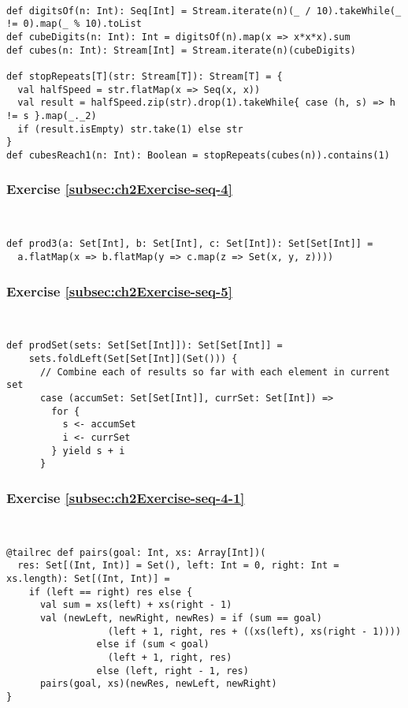 ~
\begin{lstlisting}
def digitsOf(n: Int): Seq[Int] = Stream.iterate(n)(_ / 10).takeWhile(_ != 0).map(_ % 10).toList
def cubeDigits(n: Int): Int = digitsOf(n).map(x => x*x*x).sum
def cubes(n: Int): Stream[Int] = Stream.iterate(n)(cubeDigits)

def stopRepeats[T](str: Stream[T]): Stream[T] = {
  val halfSpeed = str.flatMap(x => Seq(x, x))
  val result = halfSpeed.zip(str).drop(1).takeWhile{ case (h, s) => h != s }.map(_._2)
  if (result.isEmpty) str.take(1) else str
}
def cubesReach1(n: Int): Boolean = stopRepeats(cubes(n)).contains(1)
\end{lstlisting}


\subsubsection*{Exercise \ref{subsec:ch2Exercise-seq-4}}

~
\begin{lstlisting}
def prod3(a: Set[Int], b: Set[Int], c: Set[Int]): Set[Set[Int]] =
  a.flatMap(x => b.flatMap(y => c.map(z => Set(x, y, z))))
\end{lstlisting}


\subsubsection*{Exercise \ref{subsec:ch2Exercise-seq-5}}

~
\begin{lstlisting}
def prodSet(sets: Set[Set[Int]]): Set[Set[Int]] =
    sets.foldLeft(Set[Set[Int]](Set())) {
      // Combine each of results so far with each element in current set
      case (accumSet: Set[Set[Int]], currSet: Set[Int]) =>
        for {
          s <- accumSet
          i <- currSet
        } yield s + i
      }
\end{lstlisting}


\subsubsection*{Exercise \ref{subsec:ch2Exercise-seq-4-1}}

~
\begin{lstlisting}
@tailrec def pairs(goal: Int, xs: Array[Int])(
  res: Set[(Int, Int)] = Set(), left: Int = 0, right: Int = xs.length): Set[(Int, Int)] =
    if (left == right) res else {
      val sum = xs(left) + xs(right - 1)
      val (newLeft, newRight, newRes) = if (sum == goal) 
                  (left + 1, right, res + ((xs(left), xs(right - 1)))) 
                else if (sum < goal)
                  (left + 1, right, res)
                else (left, right - 1, res)
      pairs(goal, xs)(newRes, newLeft, newRight)
}
\end{lstlisting}


